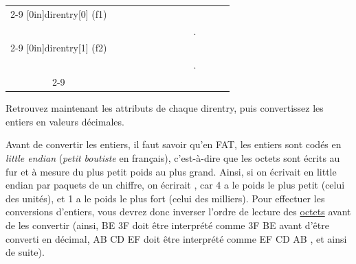 \documentclass[11pt,a4paper]{article}
\begin{document}
\begin{center}


\begin{tabular}{ c   | m{0.45cm} | m{0.45cm} | m{0.45cm} | m{0.45cm} | m{0.45cm} | m{0.45cm} | m{0.45cm} | m{0.45cm} | c | m{0.45cm} | m{0.45cm} | m{0.45cm} | }
\cline{2-9} \cline{11-13}
\multirow[c]{2}{*}[0in]{direntry[0] (f1)}  & & & & & & & & &     & & & \\
                                           & & & & & & & & &  .  & & & \\
\cline{2-9} \cline{11-13}
\multirow[c]{2}{*}[0in]{direntry[1] (f2)}  & & & & & & & & &     & & & \\
                                           & & & & & & & & &  .  & & & \\
\cline{2-9} \cline{11-13}
\end{tabular}

\end{center}

\smallskip

Retrouvez maintenant les attributs de chaque direntry, puis convertissez les entiers en valeurs décimales.

Avant de convertir les entiers, il faut savoir qu'en FAT, les entiers sont codés en \textit{little endian} (\textit{petit boutiste} en français), c'est-à-dire que les octets sont écrits au fur et à mesure du plus petit poids au plus grand.
Ainsi, si on écrivait  \fg{} en little endian par paquets de un chiffre, on écrirait  \fg{}, car 4 a le poids le plus petit (celui des unités), et 1 a le poids le plus fort (celui des milliers).
Pour effectuer les conversions d'entiers, vous devrez donc inverser l'ordre de lecture des \underline{octets} avant de les convertir (ainsi, \og BE 3F \fg{} doit être interprété comme \og 3F BE \fg{} avant d'être converti en décimal, \og AB CD EF \fg{} doit être interprété comme \og EF CD AB \fg{}, et ainsi de suite).
\end{document}
